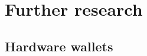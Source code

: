 \chapter{Further research}
\label{chap:further research}


\lipsum[1-2]


\section{Hardware wallets}

\lipsum[1-2]
